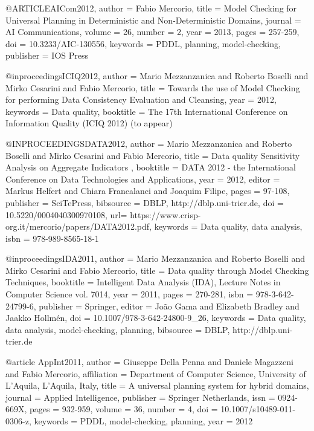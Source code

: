 {{@ARTICLE{AICom2012,
  author = {Fabio Mercorio},
  title = {Model Checking for Universal Planning in Deterministic and Non-Deterministic Domains},
  journal = {AI Communications},
  volume = {26},
  number = {2},
  year = {2013},
  pages = {257-259},
  doi = {10.3233/AIC-130556},
  keywords = {PDDL, planning, model-checking},
  publisher = {IOS Press}
}


@inproceedings{ICIQ2012,
  author    = {Mario Mezzanzanica and
               Roberto Boselli and
               Mirko Cesarini and
               Fabio Mercorio},
  title     = {Towards the use of Model Checking for performing Data Consistency Evaluation and Cleansing},
  year      = {2012},
  keywords = {Data quality},
  booktitle     = {The 17th International Conference on Information Quality (ICIQ 2012) (to appear)}
}


@INPROCEEDINGS{DATA2012,
  author = {Mario Mezzanzanica and Roberto Boselli and Mirko Cesarini and Fabio Mercorio},
  title = {Data quality Sensitivity Analysis on Aggregate Indicators },
  booktitle = {DATA 2012 -  the International Conference on Data Technologies and Applications},
  year = {2012},
  editor = {Markus Helfert and Chiara Francalanci and Joaquim Filipe},
  pages = {97-108},
  publisher = {SciTePress},
  bibsource = {DBLP, http://dblp.uni-trier.de},
  doi = {10.5220/0004040300970108},
  url= {https://www.crisp-org.it/mercorio/papers/DATA2012.pdf},
  keywords = {Data quality, data analysis},
  isbn = {978-989-8565-18-1}
}


@inproceedings{IDA2011,
  author    = {Mario Mezzanzanica and
               Roberto Boselli and
               Mirko Cesarini and
               Fabio Mercorio},
  title     = {Data quality through Model Checking Techniques},
  booktitle = {Intelligent Data Analysis (IDA), Lecture Notes in Computer Science vol. 7014},
  year      = {2011},
  pages     = {270-281},
  isbn      = {978-3-642-24799-6},
   publisher = {Springer},
 editor    = {Jo{\~a}o Gama and
               Elizabeth Bradley and
               Jaakko Hollm{\'e}n},
         doi        = {10.1007/978-3-642-24800-9_26},
         keywords = {Data quality, data analysis, model-checking, planning},
  bibsource = {DBLP, http://dblp.uni-trier.de}
}


@article {AppInt2011,
   author = {Giuseppe {Della Penna} and Daniele Magazzeni and Fabio Mercorio},
   affiliation = {Department of Computer Science, University of L'Aquila, L'Aquila, Italy},
   title = {A universal planning system for hybrid domains},
   journal = {Applied Intelligence},
   publisher = {Springer Netherlands},
   issn = {0924-669X},
   pages = {932-959},
   volume = {36},
   number = {4},
   doi = {10.1007/s10489-011-0306-z},
   keywords = {PDDL, model-checking, planning},
   year = {2012}
}

}}
